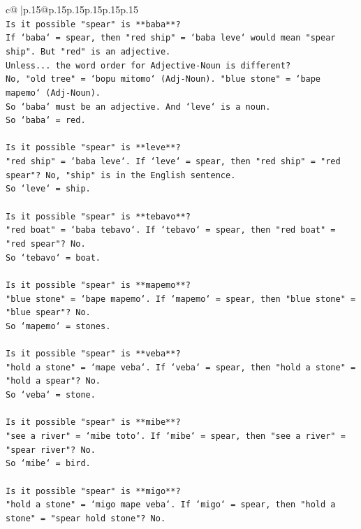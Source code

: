 \documentclass{article}
\begin{document}
{\begin{supertabular}{c@{$\;$}|p{.15\linewidth}@{}p{.15\linewidth}p{.15\linewidth}p{.15\linewidth}p{.15\linewidth}p{.15\linewidth}}
{{{\\ 
\texttt{Is it possible "spear" is **baba**?} \\
\texttt{If `baba` = spear, then "red ship" = `baba leve` would mean "spear ship". But "red" is an adjective.} \\
\texttt{Unless... the word order for Adjective{-}Noun is different?} \\
\texttt{No, "old tree" = `bopu mitomo` (Adj{-}Noun). "blue stone" = `bape mapemo` (Adj{-}Noun).} \\
\texttt{So `baba` must be an adjective. And `leve` is a noun.} \\
\texttt{So `baba` = red.} \\
\\ 
\texttt{Is it possible "spear" is **leve**?} \\
\texttt{"red ship" = `baba leve`. If `leve` = spear, then "red ship" = "red spear"? No, "ship" is in the English sentence.} \\
\texttt{So `leve` = ship.} \\
\\ 
\texttt{Is it possible "spear" is **tebavo**?} \\
\texttt{"red boat" = `baba tebavo`. If `tebavo` = spear, then "red boat" = "red spear"? No.} \\
\texttt{So `tebavo` = boat.} \\
\\ 
\texttt{Is it possible "spear" is **mapemo**?} \\
\texttt{"blue stone" = `bape mapemo`. If `mapemo` = spear, then "blue stone" = "blue spear"? No.} \\
\texttt{So `mapemo` = stones.} \\
\\ 
\texttt{Is it possible "spear" is **veba**?} \\
\texttt{"hold a stone" = `mape veba`. If `veba` = spear, then "hold a stone" = "hold a spear"? No.} \\
\texttt{So `veba` = stone.} \\
\\ 
\texttt{Is it possible "spear" is **mibe**?} \\
\texttt{"see a river" = `mibe toto`. If `mibe` = spear, then "see a river" = "spear river"? No.} \\
\texttt{So `mibe` = bird.} \\
\\ 
\texttt{Is it possible "spear" is **migo**?} \\
\texttt{"hold a stone" = `migo mape veba`. If `migo` = spear, then "hold a stone" = "spear hold stone"? No.} \\
}}}
\end{supertabular}}
\end{document}
